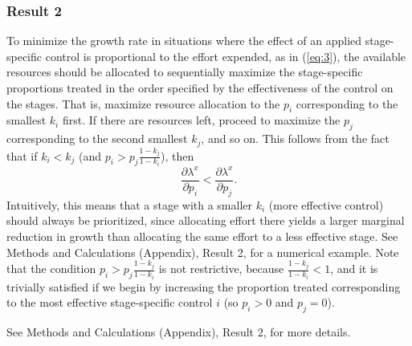 \documentclass[onecolumn]{article}
\begin{document}
\subsubsection*{Result 2}
To minimize the growth rate in situations where the effect of an applied stage-specific control is proportional to the effort expended, as in (\ref{eq:3}), the available resources should be allocated to sequentially maximize the stage-specific proportions treated in the order specified by the effectiveness of the control on the stages. That is, maximize resource allocation to the $p_i$ corresponding to the smallest $k_i$ first. If there are resources left, proceed to maximize the $p_j$ corresponding to the second smallest $k_j$, and so on. This follows from the fact that if $k_i < k_j$ (and $p_i > p_j\frac{1 - k_j}{1 - k_i}$), then
\begin{equation}\label{eq:4} \frac{\partial\lambda^x}{\partial p_i} < \frac{\partial\lambda^x}{\partial p_j}. \end{equation}
Intuitively, this means that a stage with a smaller $k_i$ (more effective control) should always be prioritized, since allocating effort there yields a larger marginal reduction in growth than allocating the same effort to a less effective stage. See Methods and Calculations (Appendix), Result 2, for a numerical example. Note that the condition $p_i > p_j\frac{1 - k_j}{1 - k_i}$ is not restrictive, because $\frac{1 - k_j}{1 - k_i} < 1$, and it is trivially satisfied if we begin by increasing the proportion treated corresponding to the most effective stage-specific control $i$ (so $p_i > 0$ and $p_j = 0$).

See Methods and Calculations (Appendix), Result 2, for more details.
\end{document}

